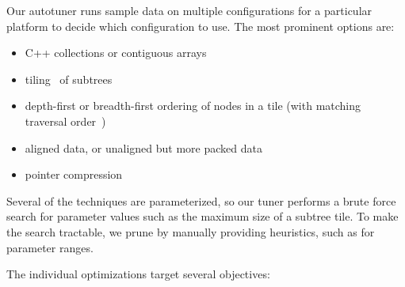 Our autotuner runs sample data on multiple configurations for a particular platform to decide which configuration to use. The most prominent options are:

\begin{itemize}
\item C++ collections or contiguous arrays
\item tiling~\cite{tiling} of subtrees
\item depth-first or breadth-first ordering of nodes in a tile (with matching traversal order~\cite{Chilimbi:1999})
\item aligned data, or unaligned but more packed data
\item pointer compression
\end{itemize}
Several of the techniques are parameterized, so our tuner performs a brute force search for parameter values such as the maximum size of a subtree tile. To make the search tractable, we prune by manually providing heuristics, such as for parameter ranges.

The individual optimizations target several objectives:

